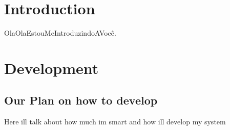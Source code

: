 \hypertarget{index_Intro_Section}{}\section{Introduction}\label{index_Intro_Section}
Ola\+Ola\+Estou\+Me\+Introduzindo\+A\+Você. \hypertarget{index_Dev_Section}{}\section{Development}\label{index_Dev_Section}
\hypertarget{index_planning}{}\subsection{Our Plan on how to develop}\label{index_planning}
Here i\textquotesingle{}ll talk about how much i\textquotesingle{}m smart and how i\textquotesingle{}ll develop my system 